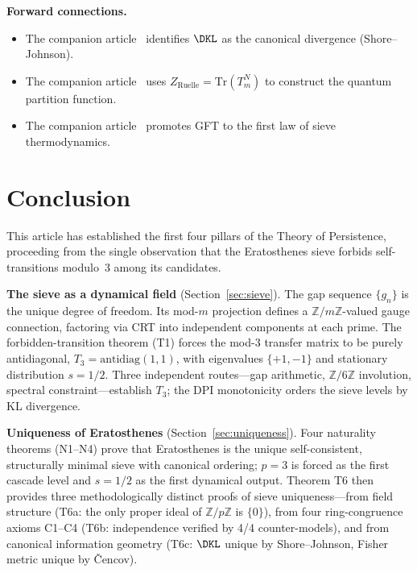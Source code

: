 \documentclass[12pt,a4paper]{article}
\begin{document}
\medskip\noindent\textbf{Forward connections.}
\begin{itemize}
\item The companion article~\cite{companion_M2} identifies $\DKL$ as the canonical divergence (Shore--Johnson).
\item The companion article~\cite{companion_M5} uses $Z_{\mathrm{Ruelle}} = \mathrm{Tr}(T_m^N)$ to
  construct the quantum partition function.
\item The companion article~\cite{companion_M5} promotes GFT to the first law of sieve thermodynamics.
\end{itemize}


\section{Conclusion}
\label{sec:conclusion}

This article has established the first four pillars of the Theory of
Persistence, proceeding from the single observation that the
Eratosthenes sieve forbids self-transitions modulo~3 among its
candidates.

\textbf{The sieve as a dynamical field} (Section~\ref{sec:sieve}).
The gap sequence $\{g_n\}$ is the unique degree of freedom.  Its
mod-$m$ projection defines a $\mathbb{Z}/m\mathbb{Z}$-valued gauge
connection, factoring via CRT into independent components at each
prime.  The forbidden-transition theorem (T1) forces the mod-$3$
transfer matrix to be purely antidiagonal, $T_3 = \mathrm{antidiag}(1,1)$,
with eigenvalues $\{+1,-1\}$ and stationary distribution $s = 1/2$.
Three independent routes---gap arithmetic, $\mathbb{Z}/6\mathbb{Z}$
involution, spectral constraint---establish $T_3$; the DPI
monotonicity orders the sieve levels by KL divergence.

\textbf{Uniqueness of Eratosthenes} (Section~\ref{sec:uniqueness}).
Four naturality theorems (N1--N4) prove that Eratosthenes is the
unique self-consistent, structurally minimal sieve with canonical
ordering; $p = 3$ is forced as the first cascade level and $s = 1/2$
as the first dynamical output.  Theorem T6 then provides three
methodologically distinct proofs of sieve uniqueness---from field
structure (T6a: the only proper ideal of $\mathbb{Z}/p\mathbb{Z}$ is
$\{0\}$), from four ring-congruence axioms C1--C4 (T6b: independence
verified by 4/4 counter-models), and from canonical information
geometry (T6c: $\DKL$ unique by Shore--Johnson, Fisher metric unique
by \v{C}encov).
\end{document}
